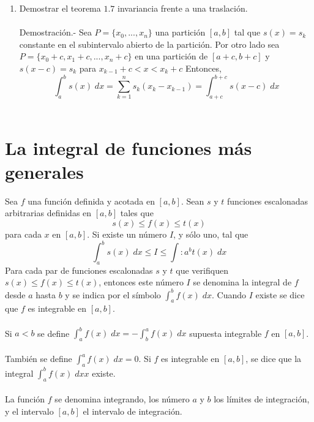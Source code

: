 \begin{enumerate}
    \item Demostrar el teorema $1.7$ invariancia frente a una traslación.\\\\
	Demostración.-\;  Sea $P=\lbrace x_0,...,x_n \rbrace$ una partición $[a,b]$ tal que $s(x)=s_k$ constante en el subintervalo abierto de la partición. Por otro lado sea $P=\lbrace x_0+c,x_1+c,...,x_n+c \rbrace$ en una partición de $[a+c,b+c]$ y $s(x-c)=s_k$ para $x_{k-1}+c<x<x_k+c$ Entonces,
	$$\displaystyle\int_a^b s(x) \; dx = \sum\limits_{k=1}^n s_k(x_k-x_{k-1}) = \int_{a+c}^{b+c} s(x-c)\; dx $$\\

\end{enumerate}

\section{La integral de funciones más generales}

\begin{tcolorbox}[colframe = white]
    \begin{def.} Sea $f$ una función definida y acotada en $[a,b]$. Sean $s$ y $t$ funciones escalonadas arbitrarias definidas en $[a,b]$ tales que $$s(x)\leq f(x) \leq t(x)$$
	para cada $x$ en $[a,b]$. Si existe un número $I$, y sólo uno, tal que $$\displaystyle\int_a^b s(x)\; dx \leq I \leq \int:a^b t(x) \; dx$$
	Para cada par de funciones escalonadas $s$ y $t$ que verifiquen $s(x) \leq f(x) \leq t(x)$, entonces este número $I$ se denomina la integral de $f$ desde $a$ hasta $b$ y se indica por el símbolo $\displaystyle\int_a^b f(x) \; dx$. Cuando $I$ existe se dice que $f$ es integrable en $[a,b]$.\\\\
	Si $a<b$ se define $\displaystyle\int_a^b f(x) \; dx = - \int_b^a f(x) \; dx$ supuesta integrable $f$ en $[a,b]$.\\\\
	También se define $\displaystyle\int_a^a f(x) \; dx=0$. Si $f$ es integrable en $[a,b]$, se dice que la integral $\displaystyle\int_a^b f(x) \; dx x$ existe.\\\\
	La función $f$ se denomina integrando, los número $a$ y $b$ los límites de integración, y el intervalo $[a,b]$ el intervalo de integración.
    \end{def.}
\end{tcolorbox}

